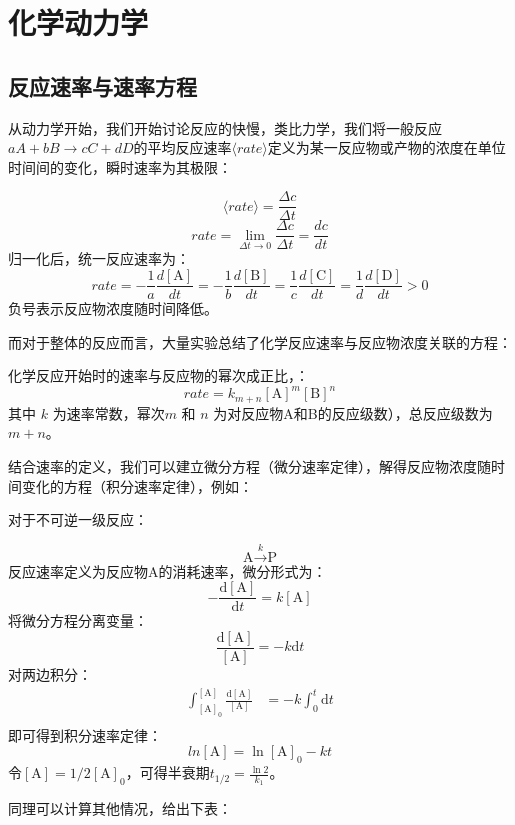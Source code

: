 \section{化学动力学}
\subsection{反应速率与速率方程}
从动力学开始，我们开始讨论反应的快慢，类比力学，我们将一般反应 $aA + bB \rightarrow cC + dD$的平均反应速率$\langle rate \rangle$定义为某一反应物或产物的浓度在单位时间间的变化，瞬时速率为其极限：
\begin{definition}[反应速率]
$$\langle rate \rangle = \frac{\Delta c}{\Delta t}$$
$$rate = \lim_{\Delta t \to 0} \frac{\Delta c}{\Delta t} = \frac{dc}{dt}$$
归一化后，统一反应速率为：
$$rate = -\frac{1}{a}\frac{d[\text{A}]}{dt} = -\frac{1}{b}\frac{d[\text{B}]}{dt} = \frac{1}{c}\frac{d[\text{C}]}{dt} = \frac{1}{d}\frac{d[\text{D}]}{dt} > 0$$
负号表示反应物浓度随时间降低。
\end{definition}

而对于整体的反应而言，大量实验总结了化学反应速率与反应物浓度关联的方程：

\begin{definition}[动力实验方程]
化学反应开始时的速率与反应物的幂次成正比，：
$$rate = k_{m+n}[\text{A}]^m[\text{B}]^n$$
其中 $k$ 为速率常数，幂次$m$ 和 $n$ 为对反应物A和B的反应级数），总反应级数为 $m + n$。
\end{definition}

结合速率的定义，我们可以建立微分方程（微分速率定律），解得反应物浓度随时间变化的方程（积分速率定律），例如：

对于不可逆一级反应：

$$\text{A} \xrightarrow{k} \text{P}$$反应速率定义为反应物A的消耗速率，微分形式为：
$$-\frac{\text{d}[\text{A}]}{\text{d}t} = k[\text{A}]$$将微分方程分离变量：
$$\frac{\text{d}[\text{A}]}{[\text{A}]} = -k \text{d}t$$对两边积分：
\begin{align*}
\int_{[\text{A}]_0}^{[\text{A}]} \frac{\text{d}[\text{A}]}{[\text{A}]} &= -k \int_{0}^{t} \text{d}t \\
\end{align*}
即可得到积分速率定律：
$$ln[\text{A}] = \ln[\text{A}]_0 - kt$$
令$[\text{A}]=1/2[\text{A}]_0$，可得半衰期\(t_{1/2} = \frac{\ln 2}{k_1}\)。

同理可以计算其他情况，给出下表：

